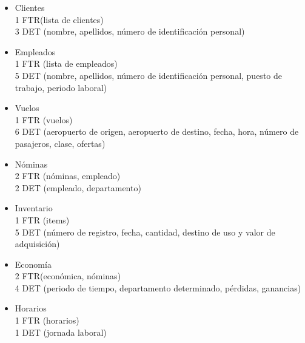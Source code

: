 \begin{enumerate}
		\begin{itemize}
			\item Clientes \\
			1 FTR(lista de clientes)\\
			3 DET (nombre, apellidos, número de identificación personal)\\					
			\item Empleados \\
			1 FTR (lista de empleados)\\
			5 DET (nombre, apellidos, número de identificación personal, puesto de trabajo, periodo laboral)\\
			\item Vuelos \\
			1 FTR (vuelos)\\
			6 DET (aeropuerto de origen, aeropuerto de destino, fecha, hora, número de pasajeros, clase, ofertas)\\
			\item Nóminas \\
			2 FTR (nóminas, empleado)\\
			2 DET (empleado, departamento)\\
			\item Inventario \\
			1 FTR (items)\\
			5 DET (número de registro, fecha, cantidad, destino de uso y valor de adquisición)\\
			\item Economía \\
			2 FTR(económica, nóminas)\\
			4 DET (periodo de tiempo, departamento determinado, pérdidas, ganancias)\\
			\item Horarios \\
			1 FTR (horarios)\\
			1 DET (jornada laboral)\\					
		\end{itemize}
	
\end{enumerate}
